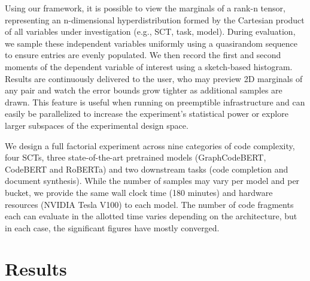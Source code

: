 \documentclass[usenames,dvipsnames]{article} %
\begin{document}
  Using our framework, it is possible to view the marginals of a rank-n tensor, representing an n-dimensional hyperdistribution formed by the Cartesian product of all variables under investigation (e.g., SCT, task, model). During evaluation, we sample these independent variables uniformly using a quasirandom sequence to ensure entries are evenly populated. We then record the first and second moments of the dependent variable of interest using a sketch-based histogram. Results are continuously delivered to the user, who may preview 2D marginals of any pair and watch the error bounds grow tighter as additional samples are drawn. This feature is useful when running on preemptible infrastructure and can easily be parallelized to increase the experiment's statistical power or explore larger subspaces of the experimental design space.

  We design a full factorial experiment across nine categories of code complexity, four SCTs, three state-of-the-art pretrained models (GraphCodeBERT, CodeBERT and RoBERTa) and two downstream tasks (code completion and document synthesis). While the number of samples may vary per model and per bucket, we provide the same wall clock time (180 minutes) and hardware resources (NVIDIA Tesla V100) to each model. The number of code fragments each can evaluate in the allotted time varies depending on the architecture, but in each case, the significant figures have mostly converged.

  \section{Results}\label{sec:results}
\end{document}

